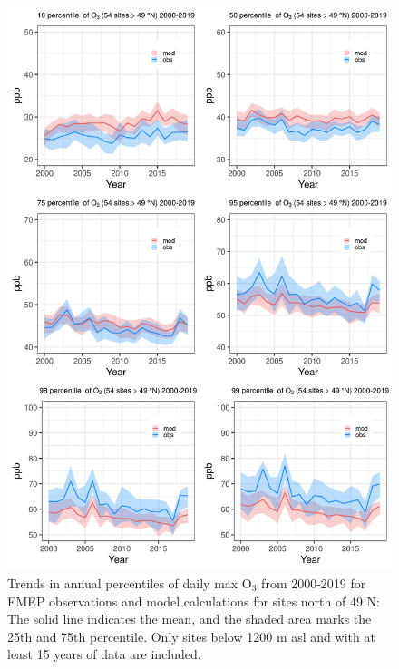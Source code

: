 \begin{figure}[h]
	\centering
	\includegraphics[width=0.74\paperwidth]{FIGS_TRENDS/alltrends_north_49_2000_2019_1200m.png}
	\caption{\label{fig:O3_perctrends_N}Trends in annual percentiles of daily max O$_3$ from 2000-2019 for EMEP observations and model calculations for sites north of 49 \degrees N: The solid line indicates the mean, and the shaded area marks the 25th and 75th percentile. Only sites below 1200 m asl and with at least 15 years of data are included.}
\end{figure}

